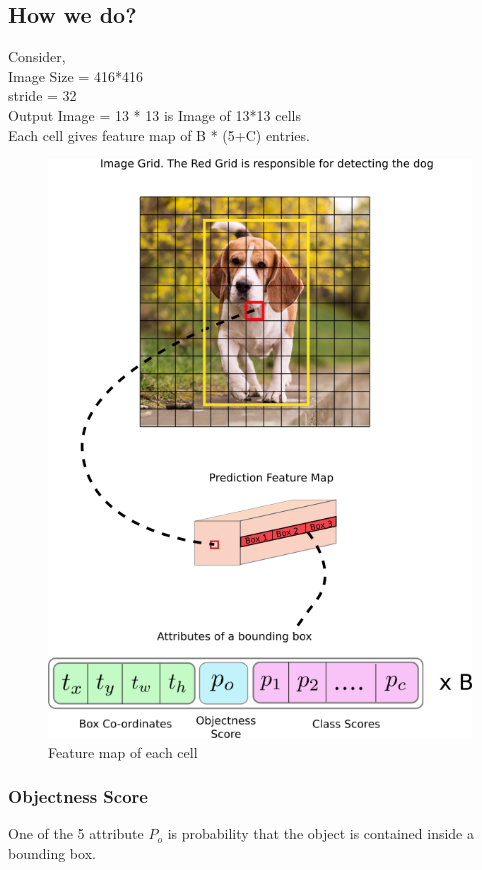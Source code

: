             \subsection{How we do?}
                Consider, \\
                    \tab Image Size = 416*416\\
		            \tab stride = 32\\
		            \tab Output Image = 13 * 13 is Image of 13*13 cells\\
		        Each cell gives feature map of  B * (5+C) entries.\\
		    \begin{figure}[ht]
                \centering
                \includegraphics[scale=0.4]{img/yolo-5.png}
                \caption{Feature map of each cell}
                \label{fig:}
            \end{figure}
		        \subsubsection{Objectness Score}
                    One of the 5 attribute $P_o$ is probability that the object is contained inside a bounding box.
                    
